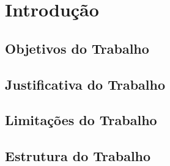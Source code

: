 
\ifdraft{\color{green}}{}\chapter{Introdução}\color{black}



\ifdraft{\color{green}}{}\section{Objetivos do Trabalho}\color{black}



\section{Justificativa do Trabalho}



\ifdraft{\color{green}}{}\section{Limitações do Trabalho}\color{black}



\ifdraft{\color{green}}{}\section{Estrutura do Trabalho}\color{black}


